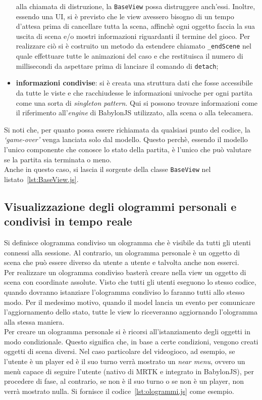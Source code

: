 \begin{itemize}
    alla chiamata di distruzione, la \texttt{BaseView} possa distruggere anch'essi. Inoltre, essendo una UI, si è previsto che le view avessero bisogno di un tempo d'attesa prima di 
    cancellare tutta la scena, affinchè ogni oggetto faccia la sua uscita di scena e/o mostri informazioni riguardanti il termine del gioco. Per realizzare ciò si è costruito un metodo 
    da estendere chiamato \texttt{\_endScene} nel quale effettuare tutte le animazioni del caso e che restituisca il numero di millisecondi da aspettare prima di lanciare il comando di 
    \texttt{detach};
    \item \textbf{informazioni condivise}: si è creata una struttura dati che fosse accessibile da tutte le viste e che racchiudesse le informazioni univoche per ogni partita come una sorta
    di \textit{singleton pattern}. Qui si possono trovare informazioni come il riferimento all'\textit{engine} di BabylonJS utilizzato, alla scena o alla telecamera.
\end{itemize}
Si noti che, per quanto possa essere richiamata da qualsiasi punto del codice, la \textit{`game-over'} venga lanciata solo dal modello. Questo perchè, essendo il modello l'unico 
componente che conosce lo stato della partita, è l'unico che può valutare se la partita sia terminata o meno.\\
Anche in questo caso, si lascia il sorgente della classe \texttt{BaseView} nel listato~\ref{lst:BaseView.js}.


\subsection{Visualizzazione degli ologrammi personali e condivisi in tempo reale}
Si definisce ologramma condiviso un ologramma che è visibile da tutti gli utenti connessi alla sessione. Al contrario, un ologramma personale è un oggetto di scena che può essere diverso
da utente a utente e talvolta anche non esserci.\\
Per realizzare un ologramma condiviso basterà creare nella view un oggetto di scena con coordinate assolute. Visto che tutti gli utenti eseguono lo stesso codice, quando
dovranno istanziare l'ologramma condiviso lo faranno tutti allo stesso modo. Per il medesimo motivo, quando il model lancia un evento per comunicare l'aggiornamento dello stato, tutte le 
view lo riceveranno aggiornando l'ologramma alla stessa maniera.\\
Per creare un ologramma personale si è ricorsi all'istanziamento degli oggetti in modo condizionale. Questo significa che, in base a certe condizioni, vengono creati oggetti di scena 
diversi. Nel caso particolare del videogioco, ad esempio, se l'utente è un player ed è il suo turno verrà mostrato un
\textit{near menu}, ovvero un menù capace di seguire l'utente (nativo di MRTK e integrato in BabylonJS), per procedere di fase, al contrario, se non è il suo turno o se non è un
player, non verrà mostrato nulla. Si fornisce il codice~\ref{lst:ologrammi.js} come esempio. 

